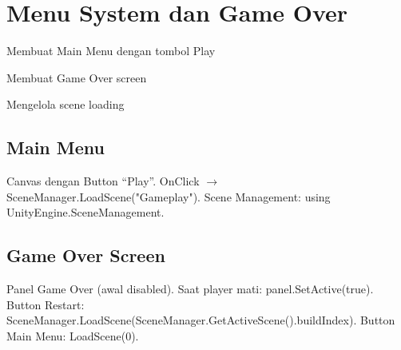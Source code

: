 \section{Menu System dan Game Over}

\begin{learningoutcomes}
\item Membuat Main Menu dengan tombol Play
\item Membuat Game Over screen
\item Mengelola scene loading
\end{learningoutcomes}

\subsection{Main Menu}

Canvas dengan Button ``Play''. OnClick $\rightarrow$ SceneManager.LoadScene("Gameplay"). Scene Management: using UnityEngine.SceneManagement.

\subsection{Game Over Screen}

Panel Game Over (awal disabled). Saat player mati: panel.SetActive(true). Button Restart: SceneManager.LoadScene(SceneManager.GetActiveScene().buildIndex). Button Main Menu: LoadScene(0).
